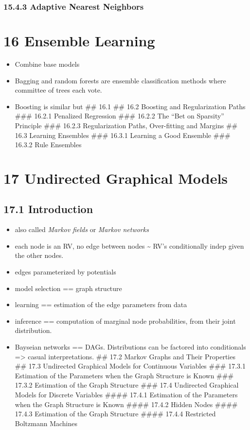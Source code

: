 \documentclass[11pt]{article}
\providecommand{\tightlist}{%
      \setlength{\itemsep}{0pt}\setlength{\parskip}{0pt}}
\begin{document}
\subsubsection{15.4.3 Adaptive Nearest
Neighbors}\label{adaptive-nearest-neighbors}

    \section{16 Ensemble Learning}\label{ensemble-learning}

\begin{itemize}
\tightlist
\item
  Combine base models
\item
  Bagging and random forests are ensemble classification methods where
  committee of trees each vote.
\item
  Boosting is similar but \#\# 16.1 \#\# 16.2 Boosting and
  Regularization Paths \#\#\# 16.2.1 Penalized Regression \#\#\# 16.2.2
  The ``Bet on Sparsity'' Principle \#\#\# 16.2.3 Regularization Paths,
  Over-fitting and Margins \#\# 16.3 Learning Ensembles \#\#\# 16.3.1
  Learning a Good Ensemble \#\#\# 16.3.2 Rule Ensembles
\end{itemize}

    \section{17 Undirected Graphical
Models}\label{undirected-graphical-models}

\subsection{17.1 Introduction}\label{introduction}

\begin{itemize}
\tightlist
\item
  also called \emph{Markov fields} or \emph{Markov networks}
\item
  each node is an RV, no edge between nodes \textasciitilde{} RV's
  conditionally indep given the other nodes.
\item
  edges parameterized by potentials
\item
  model selection == graph structure
\item
  learning == estimation of the edge parameters from data
\item
  inference == computation of marginal node probabilities, from their
  joint distribution.
\item
  Bayseian networks == DAGs. Distributions can be factored into
  conditionals =\textgreater{} casual interpretations. \#\# 17.2 Markov
  Graphs and Their Properties \#\# 17.3 Undirected Graphical Models for
  Continuous Variables \#\#\# 17.3.1 Estimation of the Parameters when
  the Graph Structure is Known \#\#\# 17.3.2 Estimation of the Graph
  Structure \#\#\# 17.4 Undirected Graphical Models for Discrete
  Variables \#\#\#\# 17.4.1 Estimation of the Parameters when the Graph
  Structure is Known \#\#\#\# 17.4.2 Hidden Nodes \#\#\#\# 17.4.3
  Estimation of the Graph Structure \#\#\#\# 17.4.4 Restricted Boltzmann
  Machines
\end{itemize}
\end{document}
